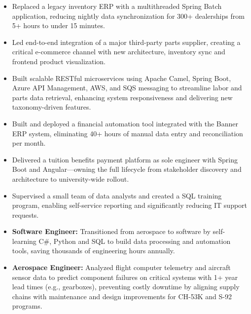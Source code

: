 \begin{itemize}[leftmargin=*, itemsep=\bulletItemSeparation, topsep=0pt]
    \item Replaced a legacy inventory ERP with a multithreaded Spring Batch application, reducing nightly data synchronization for 300+ dealerships from 5+ hours to under 15 minutes.
    \item Led end-to-end integration of a major third-party parts supplier, creating a critical e-commerce channel with new architecture, inventory sync and frontend product visualization.
    \item Built scalable RESTful microservices using Apache Camel, Spring Boot, Azure API Management, AWS, and SQS messaging to streamline labor and parts data retrieval, enhancing system responsiveness and delivering new taxonomy-driven features.
\end{itemize}
\vspace{\spacingBetweenJobs}

\begin{itemize}[leftmargin=*, itemsep=\bulletItemSeparation, topsep=0pt]
    \item Built and deployed a financial automation tool integrated with the Banner ERP system, eliminating 40+ hours of manual data entry and reconciliation per month.
    \item Delivered a tuition benefits payment platform as sole engineer with Spring Boot and Angular—owning the full lifecycle from stakeholder discovery and architecture to university-wide rollout.
    \item Supervised a small team of data analysts and created a SQL training program, enabling self-service reporting and significantly reducing IT support requests.
\end{itemize}
\vspace{\spacingBetweenJobs}

\begin{itemize}[leftmargin=*, itemsep=\bulletItemSeparation, topsep=0pt]
    \item \textbf{Software Engineer:} Transitioned from aerospace to software by self-learning C\#, Python and SQL to build data processing and automation tools, saving thousands of engineering hours annually.
    \item \textbf{Aerospace Engineer:} Analyzed flight computer telemetry and aircraft sensor data to predict component failures on critical systems with 1+ year lead times (e.g., gearboxes), preventing costly downtime by aligning supply chains with maintenance and design improvements for CH-53K and S-92 programs.
\end{itemize}
\vspace{\spacingBetweenJobs}

